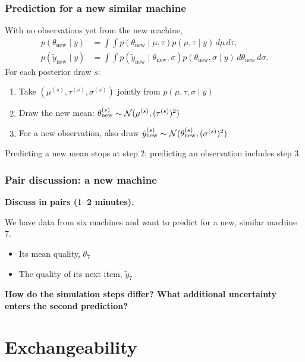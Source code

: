 \documentclass[10pt]{beamer}
\begin{document}
\begin{frame}
\frametitle{Prediction for a new similar machine}

  With no observations yet from the new machine,
  \begin{align*}
    p(\theta_{\mathrm{new}}\mid y)
      &=\int\!\int p(\theta_{\mathrm{new}}\mid\mu,\tau)
        p(\mu,\tau\mid y)\,d\mu\,d\tau,\\
    p(\tilde y_{\mathrm{new}}\mid y)
      &=\int\!\int p(\tilde y_{\mathrm{new}}\mid\theta_{\mathrm{new}},\sigma)
        p(\theta_{\mathrm{new}},\sigma\mid y)\,d\theta_{\mathrm{new}}\,d\sigma.
  \end{align*}
  For each posterior draw $s$:
  \begin{enumerate}
  \item Take $(\mu^{(s)},\tau^{(s)},\sigma^{(s)})$ jointly from
    $p(\mu,\tau,\sigma\mid y)$
  \item Draw the new mean:
    $\theta_{\mathrm{new}}^{(s)}\sim\mathcal{N}(\mu^{(s)},(\tau^{(s)})^2)$
  \item For a new observation, also draw
    $\tilde y_{\mathrm{new}}^{(s)}\sim
      \mathcal{N}(\theta_{\mathrm{new}}^{(s)},(\sigma^{(s)})^2)$
  \end{enumerate}
  Predicting a new mean stops at step 2; predicting an observation
  includes step 3.
\end{frame}

\begin{frame}
\frametitle{Pair discussion: a new machine}

  {\color{uured}\textbf{Discuss in pairs (1--2 minutes).}}

  We have data from six machines and want to predict for a new,
  similar machine 7.
  \begin{itemize}
  \item Its mean quality, $\theta_7$
  \item The quality of its next item, $\tilde y_7$
  \end{itemize}
  \textbf{How do the simulation steps differ? What additional
    uncertainty enters the second prediction?}

\end{frame}

\section{Exchangeability}
\frame{\sectionpage}
\end{document}
